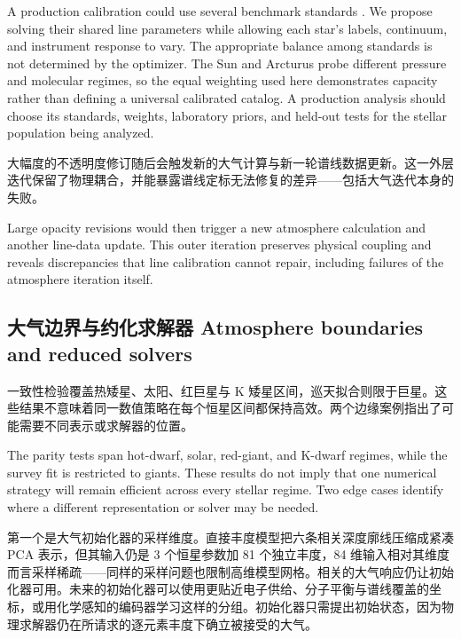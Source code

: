 \begin{EN}
A production calibration could use several benchmark standards
\citep{Heiter2015,Jofre2015,Smith2021}. We propose solving their shared line
parameters while allowing each star's labels, continuum, and instrument
response to vary. The appropriate balance among standards is not determined by the
optimizer. The Sun and Arcturus probe different pressure and molecular regimes,
so the equal weighting used here demonstrates capacity rather than defining a
universal calibrated catalog. A production analysis should choose its standards,
weights, laboratory priors, and held-out tests for the stellar population being
analyzed.
\end{EN}

大幅度的不透明度修订随后会触发新的大气计算与新一轮谱线数据更新。这一外层迭代保留了物理耦合，并能暴露谱线定标无法修复的差异——包括大气迭代本身的失败。

\begin{EN}
Large opacity revisions would then trigger a new atmosphere
calculation and another line-data update. This outer iteration preserves
physical coupling and reveals discrepancies that line calibration cannot
repair, including failures of the atmosphere iteration itself.
\end{EN}

\subsection{大气边界与约化求解器 Atmosphere boundaries and reduced solvers}\label{sec:discussion_fixed_point}

一致性检验覆盖热矮星、太阳、红巨星与 K 矮星区间，巡天拟合则限于巨星。这些结果不意味着同一数值策略在每个恒星区间都保持高效。两个边缘案例指出了可能需要不同表示或求解器的位置。

\begin{EN}
The parity tests span hot-dwarf, solar, red-giant, and K-dwarf regimes, while
the survey fit is restricted to giants. These results do not imply that one
numerical strategy will remain efficient across every stellar regime. Two edge
cases identify where a different representation or solver may be needed.
\end{EN}

第一个是大气初始化器的采样维度。直接丰度模型把六条相关深度廓线压缩成紧凑 PCA 表示，但其输入仍是 3 个恒星参数加 81 个独立丰度，84 维输入相对其维度而言采样稀疏——同样的采样问题也限制高维模型网格。相关的大气响应仍让初始化器可用。未来的初始化器可以使用更贴近电子供给、分子平衡与谱线覆盖的坐标，或用化学感知的编码器学习这样的分组。初始化器只需提出初始状态，因为物理求解器仍在所请求的逐元素丰度下确立被接受的大气。

